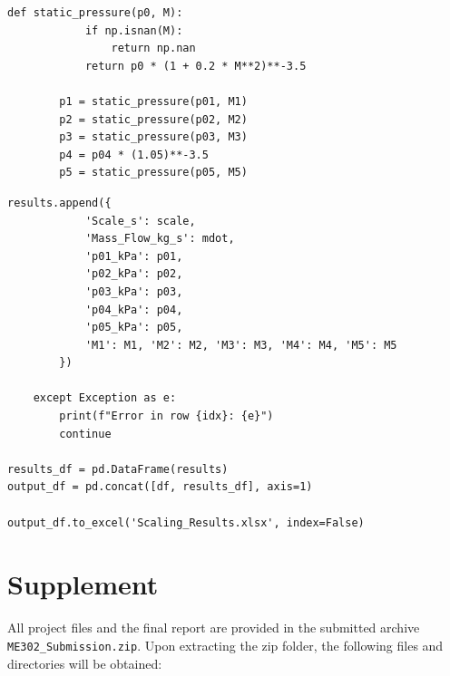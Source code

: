 \documentclass[12pt]{article}
\begin{document}
\newpage
\begin{lstlisting}[caption={Static Pressure Calculations}]
        def static_pressure(p0, M):
            if np.isnan(M):
                return np.nan
            return p0 * (1 + 0.2 * M**2)**-3.5

        p1 = static_pressure(p01, M1)
        p2 = static_pressure(p02, M2)
        p3 = static_pressure(p03, M3)
        p4 = p04 * (1.05)**-3.5
        p5 = static_pressure(p05, M5)
\end{lstlisting}
\begin{lstlisting}[caption={Export Results}]
        results.append({
            'Scale_s': scale,
            'Mass_Flow_kg_s': mdot,
            'p01_kPa': p01,
            'p02_kPa': p02,
            'p03_kPa': p03,
            'p04_kPa': p04,
            'p05_kPa': p05,
            'M1': M1, 'M2': M2, 'M3': M3, 'M4': M4, 'M5': M5
        })

    except Exception as e:
        print(f"Error in row {idx}: {e}")
        continue

results_df = pd.DataFrame(results)
output_df = pd.concat([df, results_df], axis=1)

output_df.to_excel('Scaling_Results.xlsx', index=False)
\end{lstlisting}

\newpage
\section*{Supplement}

All project files and the final report are provided in the submitted archive \texttt{ME302\_Submission.zip}. Upon extracting the zip folder, the following files and directories will be obtained:
\end{document}
